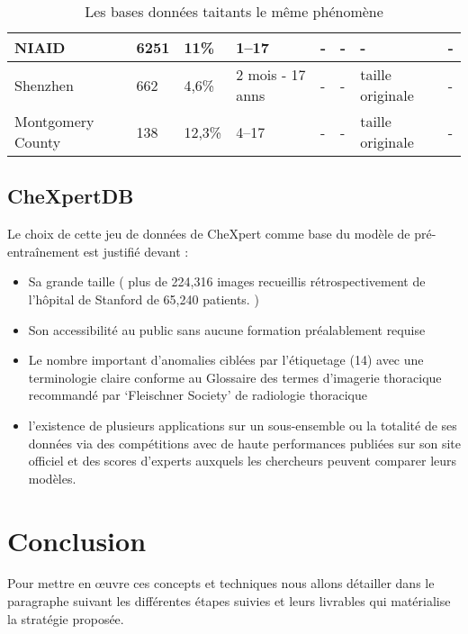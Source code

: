 \begin{table}[H]
\begin{tabularx}{\textwidth}{ |X|X|X|X|X|X|X|X| }
            \hline
            \hfil NIAID & \hfil 6251 & \hfil 11\% & \hfil 1–17 & \hfil - & \hfil - & \hfil - & \hfil - \\
            \hline
            \hfil Shenzhen & \hfil 662 & \hfil 4,6\% & \hfil 2 mois - 17 anns & \hfil - & \hfil - & \hfil taille originale & \hfil - \\
            \hline
            \hfil Montgomery County & \hfil 138 & \hfil 12,3\% &  \hfil 4–17 & \hfil - & \hfil - & \hfil taille originale & \hfil - \\
            \hline
        \end{tabularx}
        \caption{Les bases données taitants le même phénomène}\label{table:all_dbs}
    \end{table}
    \subsection{CheXpertDB}\label{chexpertDB}
    Le choix de cette  jeu de données de CheXpert comme base du modèle de pré-entraînement est justifié devant :
    \begin{itemize}[label=$\bullet$]
        \item Sa grande taille  ( plus de 224,316  images recueillis rétrospectivement de l'hôpital de Stanford de 65,240 patients. ) 
        \item Son accessibilité au public sans aucune formation préalablement requise
        \item Le nombre important d’anomalies ciblées par l'étiquetage (14) avec une terminologie claire conforme au Glossaire des termes d'imagerie thoracique recommandé par ‘Fleischner Society’ de radiologie thoracique 
        \item l’existence de plusieurs applications sur un sous-ensemble ou  la totalité de ses données via des compétitions avec de haute performances publiées sur son site officiel et des scores d'experts auxquels les chercheurs peuvent comparer leurs modèles.
        

    \end{itemize}

\section*{Conclusion}
Pour mettre en œuvre ces concepts et techniques nous allons détailler dans le paragraphe suivant les différentes étapes suivies et leurs livrables qui matérialise la stratégie proposée.